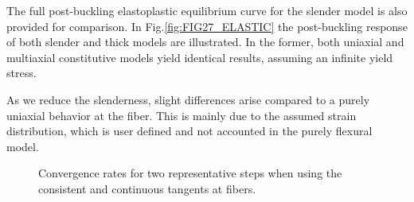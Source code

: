  The full post-buckling elastoplastic equilibrium curve for 
the slender model is also provided for comparison. In 
Fig.\ref{fig:FIG27_ELASTIC} the post-buckling response of both slender and 
thick 
models are illustrated. In the former, both uniaxial and multiaxial 
constitutive models yield identical results, assuming an infinite yield stress.

As we reduce the slenderness, slight differences arise compared to a purely 
uniaxial behavior at the fiber. This is mainly due to the assumed strain 
distribution, which is user defined and not accounted in the purely flexural 
model.
\begin{figure}[b]
	\centering
	\caption{Convergence rates for two representative steps when using the 
	consistent and continuous tangents at fibers.}
	\label{fig:RATES}
\end{figure} 

